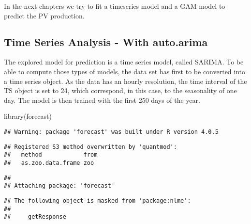 \documentclass[
]{article}
\newenvironment{Shaded}{\begin{snugshade}}{\end{snugshade}}
\newcommand{\AttributeTok}[1]{\textcolor[rgb]{0.77,0.63,0.00}{#1}}
\newcommand{\DecValTok}[1]{\textcolor[rgb]{0.00,0.00,0.81}{#1}}
\newcommand{\FunctionTok}[1]{\textcolor[rgb]{0.00,0.00,0.00}{#1}}
\newcommand{\NormalTok}[1]{#1}
\newcommand{\OtherTok}[1]{\textcolor[rgb]{0.56,0.35,0.01}{#1}}
\newcommand{\SpecialCharTok}[1]{\textcolor[rgb]{0.00,0.00,0.00}{#1}}
\begin{document}
In the next chapters we try to fit a timeseries model and a GAM model to
predict the PV production.

\newpage

\hypertarget{time-series-analysis---with-auto.arima}{%
\subsection{Time Series Analysis - With
auto.arima}\label{time-series-analysis---with-auto.arima}}

The explored model for prediction is a time series model, called SARIMA.
To be able to compute those types of models, the data set has first to
be converted into a time series object. As the data has an hourly
resolution, the time interval of the TS object is set to 24, which
correspond, in this case, to the seasonality of one day. The model is
then trained with the first 250 days of the year.

\begin{Shaded}
\begin{Highlighting}[]
\FunctionTok{library}\NormalTok{(forecast)}
\end{Highlighting}
\end{Shaded}

\begin{verbatim}
## Warning: package 'forecast' was built under R version 4.0.5
\end{verbatim}

\begin{verbatim}
## Registered S3 method overwritten by 'quantmod':
##   method            from
##   as.zoo.data.frame zoo
\end{verbatim}

\begin{verbatim}
## 
## Attaching package: 'forecast'
\end{verbatim}

\begin{verbatim}
## The following object is masked from 'package:nlme':
## 
##     getResponse
\end{verbatim}

\begin{Shaded}
\end{Shaded}
\end{document}
